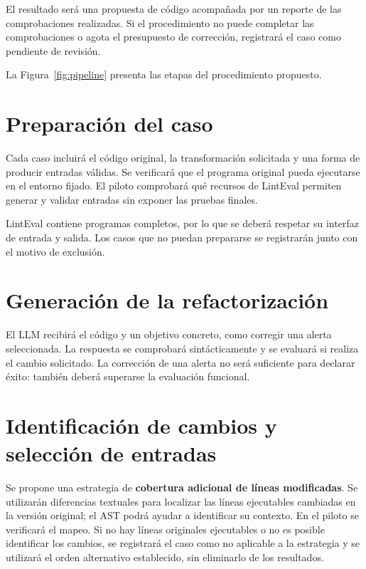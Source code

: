 \documentclass[11pt,openright,final]{unsa}
\begin{document}
El resultado será una propuesta de código acompañada por un reporte de las comprobaciones realizadas. Si el procedimiento no puede completar las comprobaciones o agota el presupuesto de corrección, registrará el caso como pendiente de revisión.

La Figura~\ref{fig:pipeline} presenta las etapas del procedimiento propuesto.


\section{Preparación del caso}

Cada caso incluirá el código original, la transformación solicitada y una forma de producir entradas válidas. Se verificará que el programa original pueda ejecutarse en el entorno fijado. El piloto comprobará qué recursos de LintEval permiten generar y validar entradas sin exponer las pruebas finales.

LintEval contiene programas completos, por lo que se deberá respetar su interfaz de entrada y salida. Los casos que no puedan prepararse se registrarán junto con el motivo de exclusión.

\section{Generación de la refactorización}

El LLM recibirá el código y un objetivo concreto, como corregir una alerta seleccionada. La respuesta se comprobará sintácticamente y se evaluará si realiza el cambio solicitado. La corrección de una alerta no será suficiente para declarar éxito: también deberá superarse la evaluación funcional.

\section{Identificación de cambios y selección de entradas}

Se propone una estrategia de \textbf{cobertura adicional de líneas modificadas}. Se utilizarán diferencias textuales para localizar las líneas ejecutables cambiadas en la versión original; el AST podrá ayudar a identificar su contexto. En el piloto se verificará el mapeo. Si no hay líneas originales ejecutables o no es posible identificar los cambios, se registrará el caso como no aplicable a la estrategia y se utilizará el orden alternativo establecido, sin eliminarlo de los resultados.
\end{document}
